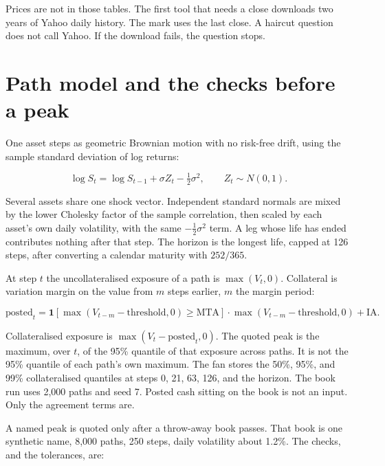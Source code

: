 \documentclass[11pt,a4paper]{article}
\begin{document}
Prices are not in those tables. The first tool that needs a close downloads two years of Yahoo daily history. The mark uses the last close. A haircut question does not call Yahoo. If the download fails, the question stops.

\section{Path model and the checks before a peak}

One asset steps as geometric Brownian motion with no risk-free drift, using the sample standard deviation of log returns:

\begin{equation}
\log S_{t}=\log S_{t-1}+\sigma Z_{t}-\tfrac12\sigma^{2},
\qquad Z_{t}\sim N(0,1).
\end{equation}

Several assets share one shock vector. Independent standard normals are mixed by the lower Cholesky factor of the sample correlation, then scaled by each asset's own daily volatility, with the same $-\frac12\sigma^{2}$ term. A leg whose life has ended contributes nothing after that step. The horizon is the longest life, capped at 126 steps, after converting a calendar maturity with $252/365$.

At step $t$ the uncollateralised exposure of a path is $\max(V_t,0)$. Collateral is variation margin on the value from $m$ steps earlier, $m$ the margin period:

\begin{equation}
\mathrm{posted}_{t}
=\mathbf{1}[\max(V_{t-m}-\mathrm{threshold},0)\ge \mathrm{MTA}]
\cdot\max(V_{t-m}-\mathrm{threshold},0)
+\mathrm{IA}.
\end{equation}

Collateralised exposure is $\max(V_t-\mathrm{posted}_t,0)$. The quoted peak is the maximum, over $t$, of the 95\% quantile of that exposure across paths. It is not the 95\% quantile of each path's own maximum. The fan stores the 50\%, 95\%, and 99\% collateralised quantiles at steps 0, 21, 63, 126, and the horizon. The book run uses 2{,}000 paths and seed 7. Posted cash sitting on the book is not an input. Only the agreement terms are.

A named peak is quoted only after a throw-away book passes. That book is one synthetic name, 8{,}000 paths, 250 steps, daily volatility about 1.2\%. The checks, and the tolerances, are:
\end{document}
